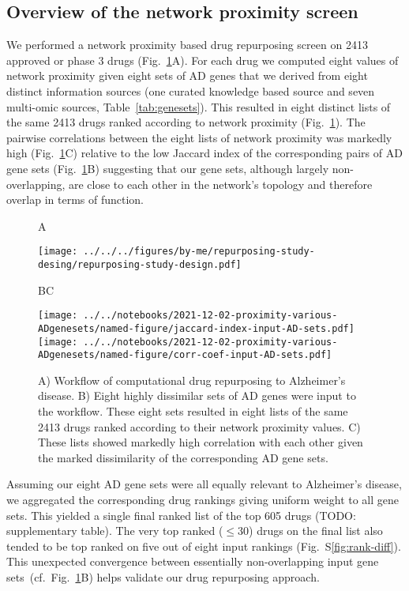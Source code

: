 \documentclass[letterpaper]{article}
\begin{document}
\subsection{Overview of the network proximity screen}

We performed a network proximity based drug repurposing screen on 2413
approved or phase 3 drugs (Fig.~\ref{fig:workflow}A).  For each drug we
computed eight values of network proximity given eight sets of AD genes that
we derived from eight distinct information sources (one curated knowledge
based source and seven multi-omic sources, Table~\ref{tab:genesets}).  This
resulted in eight distinct lists of the same 2413 drugs ranked according to
network proximity (Fig.~\ref{fig:workflow}).  The pairwise
correlations between the eight lists of network proximity was markedly high
(Fig.~\ref{fig:workflow}C) relative to the low Jaccard index of the corresponding
pairs of AD gene sets (Fig.~\ref{fig:workflow}B) suggesting that our
gene sets, although largely non-overlapping, are close to each other in the
network's topology and therefore overlap in terms of function.

\begin{figure}
\hspace{0.05\textwidth}A

\texttt{[image: ../../../figures/by-me/repurposing-study-desing/repurposing-study-design.pdf]}

\hspace{0.05\textwidth}B\hspace{0.5\textwidth}C

\texttt{[image: ../../notebooks/2021-12-02-proximity-various-ADgenesets/named-figure/jaccard-index-input-AD-sets.pdf]}
\texttt{[image: ../../notebooks/2021-12-02-proximity-various-ADgenesets/named-figure/corr-coef-input-AD-sets.pdf]}
\caption{
A) Workflow of computational drug repurposing to Alzheimer's disease.  B)
Eight highly dissimilar sets of AD genes were input to the workflow.  These
eight sets resulted in eight lists of the same 2413 drugs ranked according to
their network proximity values.  C) These lists showed markedly high
correlation with each other given the marked dissimilarity of the
corresponding AD gene sets.
}
\label{fig:workflow}
\end{figure}

Assuming our eight AD gene sets were all equally relevant to Alzheimer's
disease, we aggregated the corresponding drug rankings giving uniform weight
to all gene sets.  This yielded a single final ranked list of the top 605
drugs (TODO: supplementary table).  The very top ranked ($\le 30$) drugs on
the final list also tended to be top ranked on five out of eight input
rankings (Fig.~S\ref{fig:rank-diff}).  This unexpected convergence between
essentially non-overlapping input gene
sets~(cf.~Fig.~\ref{fig:workflow}B) helps validate our drug
repurposing approach.
\end{document}
